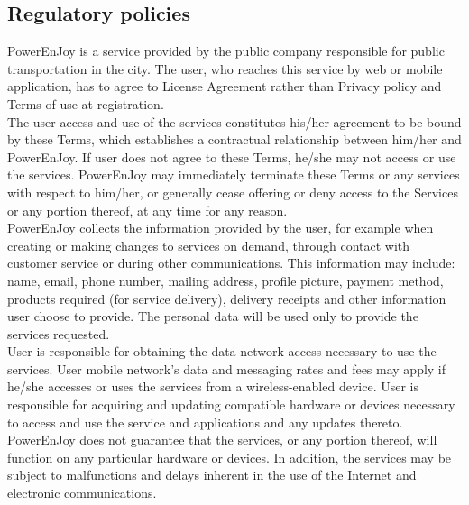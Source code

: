 \subsection{Regulatory policies}
PowerEnJoy is a service provided by the public company responsible for public transportation in the city. The user, who reaches this service by web or mobile application, has to agree to License Agreement rather than Privacy policy and Terms of use at registration.\\
The user access and use of the services constitutes his/her agreement to be bound by these Terms, which establishes a contractual relationship between him/her and PowerEnJoy. If user does not agree to these Terms, he/she may not access or use the services. PowerEnJoy may immediately terminate these Terms or any services with respect to him/her, or generally cease offering or deny access to the Services or any portion thereof, at any time for any reason.\\
PowerEnJoy collects the information provided by the user, for example when creating or making changes to services on demand, through contact with customer service or during other communications. This information may include: name, email, phone number, mailing address, profile picture, payment method, products required (for service delivery), delivery receipts and other information user choose to provide. The personal data will be used only to provide the services requested.\\
User is responsible for obtaining the data network access necessary to use the services. User mobile network's data and messaging rates and fees may apply if he/she accesses or uses the services from a wireless-enabled device. User is responsible for acquiring and updating compatible hardware or devices necessary to access and use the service and applications and any updates thereto.\\
PowerEnJoy does not guarantee that the services, or any portion thereof, will function on any particular hardware or devices. In addition, the services may be subject to malfunctions and delays inherent in the use of the Internet and electronic communications.

